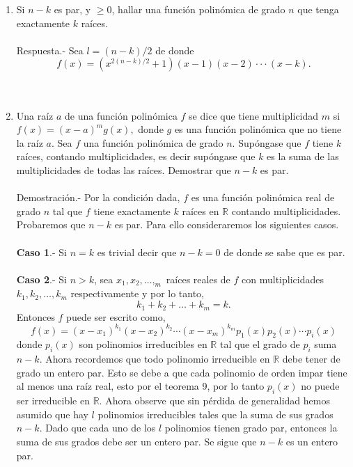 \begin{enumerate}
\begin{enumerate}[\bfseries (a)]
	\item Si $n-k$ es par, y $\geq 0$, hallar una función polinómica de grado $n$ que tenga exactamente $k$ raíces.\\\\
	    Respuesta.-\; Sea $l = (n-k)/2$ de donde 
	    $$f(x) = (x^{2(n-k)/2} + 1)(x-1)(x-2)\cdot \cdot \cdot (x-k).$$\\\\
	
	\item Una raíz $a$ de una función polinómica $f$ se dice que tiene multiplicidad $m$ si $f(x)=(x-a)^m g(x),$ donde $g$ es una función polinómica que no tiene la raíz $a$. Sea $f$ una función polinómica de grado $n$. Supóngase que $f$ tiene $k$ raíces, contando multiplicidades, es decir supóngase que $k$ es la suma de las multiplicidades de todas las raíces. Demostrar que $n-k$ es par.\\\\
	    Demostración.-\; Por la condición dada, $f$ es una función polinómica real de grado $n$ tal que $f$ tiene exactamente $k$ raíces en $\mathbb{R}$ contando multiplicidades. Probaremos que $n-k$ es par. Para ello consideraremos los siguientes casos.\\\\
	    \textbf{Caso 1}.- Si $n=k$ es trivial decir que $n-k=0$ de donde se sabe que es par.\\\\
	    \textbf{Caso 2}.- Si $n>k$, sea $x_1,x_2,\ldots , _m$ raíces reales de $f$ con multiplicidades $k_1,k_2,\ldots, k_m$ respectivamente y por lo tanto,
	    $$k_1 + k_2 + \ldots + k_m = k.$$
	    Entonces $f$ puede ser escrito como,
	    $$f(x) = (x-x_1)^{k_1}(x-x_2)^{k_2}\cdots (x-x_m)^{k_m}p_1(x)p_2(x)\cdots p_i(x)$$
	    donde $p_i(x)$ son polinomios irreducibles en $\mathbb{R}$ tal que el grado de $p_i$  suma $n-k$. Ahora recordemos que todo polinomio irreducible en $\mathbb{R}$ debe tener de grado un entero par. Esto se debe a que cada polinomio de orden impar tiene al menos una raíz real, esto por el teorema 9, por lo tanto $p_i(x)$ no puede ser irreducible en $\mathbb{R}$. Ahora observe que sin pérdida de generalidad hemos asumido que hay $l$ polinomios irreducibles tales que la suma de sus grados $n-k$. Dado que cada uno de los $l$ polinomios tienen grado par, entonces la suma de sus grados debe ser un entero par. Se sigue que $n-k$ es un entero par.\\\\ 


\end{enumerate}
\end{enumerate}
